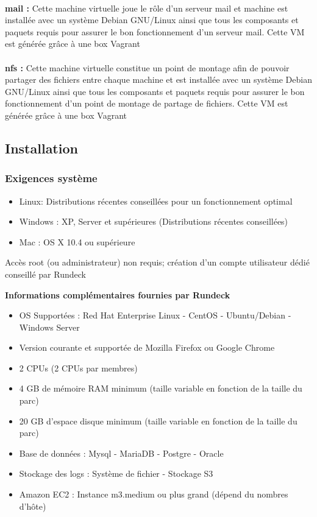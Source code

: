 \documentclass[12pt]{article}
\begin{document}
\vspace{0.5cm}
\\
\textbf{mail :}
Cette machine virtuelle joue le rôle d'un serveur mail et machine est installée avec un système Debian GNU/Linux ainsi que tous les composants et paquets requis pour assurer le bon fonctionnement d'un serveur mail. Cette VM est générée grâce à une box Vagrant 
\\
\vspace{0.5cm}
\\
\textbf{nfs :}
Cette machine virtuelle constitue un point de montage afin de pouvoir partager des fichiers entre chaque machine et est installée avec un système Debian GNU/Linux ainsi que tous les composants et paquets requis pour assurer le bon fonctionnement d'un point de montage de partage de fichiers. Cette VM est générée grâce à une box Vagrant 

\subsection{Installation}
\subsubsection{Exigences système}

\begin{itemize}
    \item Linux: Distributions récentes conseillées pour un fonctionnement optimal
    \item Windows : XP, Server et supérieures (Distributions récentes conseillées)
    \item Mac : OS X 10.4 ou supérieure
\end{itemize}

\vspace{0.5cm}

Accès root (ou administrateur) non requis; création d'un compte utilisateur dédié conseillé par Rundeck 

\vspace{0.5cm}

\textbf{Informations complémentaires fournies par Rundeck}
\begin{itemize}
    \item OS Supportées : Red Hat Enterprise Linux - CentOS - Ubuntu/Debian - Windows Server
    \item Version courante et supportée de Mozilla Firefox ou Google Chrome
    \item 2 CPUs (2 CPUs par membres)
    \item 4 GB de mémoire RAM minimum (taille variable en fonction de la taille du parc)
    \item 20 GB d'espace disque minimum (taille variable en fonction de la taille du parc)
    \item Base de données : Mysql - MariaDB - Postgre - Oracle
    \item Stockage des logs : Système de fichier - Stockage S3
    \item Amazon EC2 : Instance m3.medium ou plus grand (dépend du nombres d'hôte) 
\end{itemize}
\end{document}
